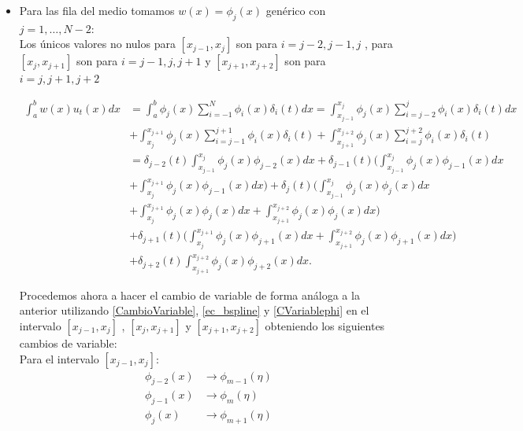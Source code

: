 \begin{itemize}
    \item Para las fila del medio tomamos $w(x) = \phi_{j}(x)$ genérico con $j=1,\ldots,N-2$:\\
    
    Los únicos valores no nulos para $[x_{j-1},x_{j}]$ son para $i=j-2,j-1,j$ , para  $[x_{j},x_{j+1}]$ son para $i=j-1,j,j+1$ y $[x_{j+1},x_{j+2}]$ son para $i=j,j+1,j+2$

\begin{equation}
\label{wphim}
\begin{split}
    \int_{a}^{b}w(x) u_{t}(x)dx & =\int_{a}^{b}\phi_{j}(x)\sum_{i=-1}^{N}\phi_{i}(x)\delta_{i}(t) dx=\int_{x_{j-1}}^{x_{j}}\phi_{j}(x)\sum_{i=j-2}^{j}\phi_{i}(x)\delta_{i}(t)dx\\
    & +\int_{x_{j}}^{x_{j+1}}\phi_{j}(x)\sum_{i=j-1}^{j+1}\phi_{i}(x)\delta_{i}(t)+\int_{x_{j+1}}^{x_{j+2}}\phi_{j}(x)\sum_{i=j}^{j+2}\phi_{i}(x)\delta_{i}(t) \\
    & =\delta_{j-2}(t)\int_{x_{j-1}}^{x_{j}}\phi_{j}(x)\phi_{j-2}(x)dx + \delta_{j-1}(t)\Bigg(\int_{x_{j-1}}^{x_{j}}\phi_{j}(x)\phi_{j-1}(x)dx\\
    & +\int_{x_{j}}^{x_{j+1}}\phi_{j}(x)\phi_{j-1}(x)dx\Bigg)+\delta_{j}(t)\Bigg(\int_{x_{j-1}}^{x_{j}}\phi_{j}(x)\phi_{j}(x)dx\\
    & +\int_{x_{j}}^{x_{j+1}}\phi_{j}(x)\phi_{j}(x)dx+\int_{x_{j+1}}^{x_{j+2}}\phi_{j}(x)\phi_{j}(x)dx\Bigg)\\
    & +\delta_{j+1}(t)\Bigg(\int_{x_{j}}^{x_{j+1}}\phi_{j}(x)\phi_{j+1}(x)dx+\int_{x_{j+1}}^{x_{j+2}}\phi_{j}(x)\phi_{j+1}(x)dx\Bigg)\\
    & + \delta_{j+2}(t)\int_{x_{j+1}}^{x_{j+2}}\phi_{j}(x)\phi_{j+2}(x)dx.
    \end{split}
\end{equation}

Procedemos ahora a hacer el cambio de variable de forma análoga a la anterior utilizando \ref{CambioVariable}, \ref{ec_bspline} y \ref{CVariablephi} en el intervalo $[x_{j-1},x_{j}]$ , $[x_{j},x_{j+1}]$ y $[x_{j+1},x_{j+2}]$  obteniendo los siguientes cambios de variable:\\

Para el intervalo $[x_{j-1},x_{j}]$:
\begin{align*}
    \phi_{j-2}(x) & \rightarrow \phi_{m-1}(\eta)\\
    \phi_{j-1}(x) & \rightarrow \phi_{m}(\eta) \\
    \phi_{j}(x) & \rightarrow \phi_{m+1}(\eta)\\
\end{align*}



\end{itemize}
